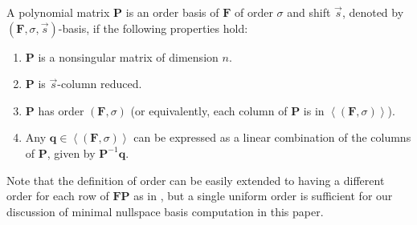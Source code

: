 \begin{defn}
A polynomial matrix $\mathbf{P}$ is an order basis of $\mathbf{F}$
of order $\sigma$ and shift $\vec{s}$, denoted by $\left(\mathbf{F},\sigma,\vec{s}\right)$-basis,
if the following properties hold:
\begin{enumerate}
\item $\mathbf{P}$ is a nonsingular matrix of dimension $n$.
\item $\mathbf{P}$ is $\vec{s}$-column reduced. 
\item $\mathbf{P}$ has order $\left(\mathbf{F},\sigma\right)$ (or equivalently,
each column of $\mathbf{P}$ is in $\left\langle (\mathbf{F},\sigma)\right\rangle $). 
\item Any $\mathbf{q}\in\left\langle \left(\mathbf{F},\sigma\right)\right\rangle $
can be expressed as a linear combination of the columns of $\mathbf{P}$,
given by $\mathbf{P}^{-1}\mathbf{q}$. 
\end{enumerate}
\end{defn}
Note that the definition of order can be easily extended to having
a different order for each row of $\mathbf{F}\mathbf{P}$ as in \citep{za2009},
but a single uniform order is sufficient for our discussion of minimal
nullspace basis computation in this paper. %
